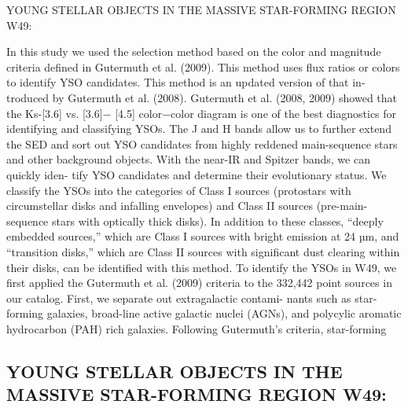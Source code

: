 \documentclass[../Main.tex]{subfiles}
\begin{document}
{YOUNG STELLAR OBJECTS IN THE MASSIVE STAR-FORMING REGION W49:

In this study we used the selection method based on
the color and magnitude criteria defined in Gutermuth et al.
(2009). This method uses flux ratios or colors to identify
YSO candidates. This method is an updated version of that in-
troduced by Gutermuth et al. (2008). Gutermuth et al. (2008,
2009) showed that the Ks-[3.6] vs. [3.6]− [4.5] color−color
diagram is one of the best diagnostics for identifying and
classifying YSOs. The J and H bands allow us to further
extend the SED and sort out YSO candidates from highly
reddened main-sequence stars and other background objects.
With the near-IR and Spitzer bands, we can quickly iden-
tify YSO candidates and determine their evolutionary status.
We classify the YSOs into the categories of Class I sources
(protostars with circumstellar disks and infalling envelopes)
and Class II sources (pre-main-sequence stars with optically
thick disks). In addition to these classes, “deeply embedded
sources,” which are Class I sources with bright emission at
24 µm, and “transition disks,” which are Class II sources with
significant dust clearing within their disks, can be identified
with this method.
To identify the YSOs in W49, we first applied the
Gutermuth et al. (2009) criteria to the 332,442 point sources
in our catalog. First, we separate out extragalactic contami-
nants such as star-forming galaxies, broad-line active galactic
nuclei (AGNs), and polycylic aromatic hydrocarbon (PAH)
rich galaxies. Following Gutermuth’s criteria, star-forming

\subsection{YOUNG STELLAR OBJECTS IN THE MASSIVE STAR-FORMING REGION W49:}

}
\end{document}
